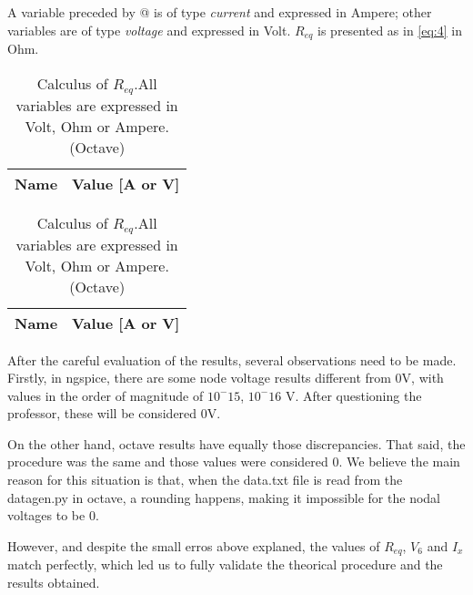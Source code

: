 A variable preceded by @ is of type {\em current} and expressed in Ampere; other variables are of type {\it voltage} and expressed in
    Volt. $R_{eq}$ is presented as in \ref{eq:4} in Ohm.

\begin{table}[ht]
\parbox{.45\linewidth}{
  \centering
  \begin{tabular}{|l|r|}
    \hline    
    {\bf Name} & {\bf Value [A or V]} \\ \hline
    
  \end{tabular}
  \caption{Simulation of $R_{eq}$. All variables are expressed in Volt, Ohm or Ampere. (NgSpice)}} 
\parbox{.45\linewidth}{
  \centering
  \begin{tabular}{|l|r|}
    \hline    
    {\bf Name} & {\bf Value [A or V]} \\ \hline
    
  \end{tabular}
  \caption{Calculus of $R_{eq}$.All variables are expressed in Volt, Ohm or Ampere. (Octave)}}
 
\end{table}

\par After the careful evaluation of the results, several observations need to be made. Firstly, in ngspice, there are some node voltage results different from 0V, with  values  in the order of magnitude of $10^-15$, $10^-16$ V. After questioning the professor, these will be considered 0V.

\par On the other hand, octave results have equally those discrepancies. That said, the procedure was the same and those values were considered 0. We believe the main reason for this situation is that, when the data.txt file is read from the datagen.py in octave, a rounding happens, making it impossible for the nodal voltages to be 0. 

\par However, and despite the small erros above explaned, the values of $R_{eq}$, $V_{6}$ and $I_{x}$ match perfectly, which led us to fully validate the theorical procedure and the results obtained.



























